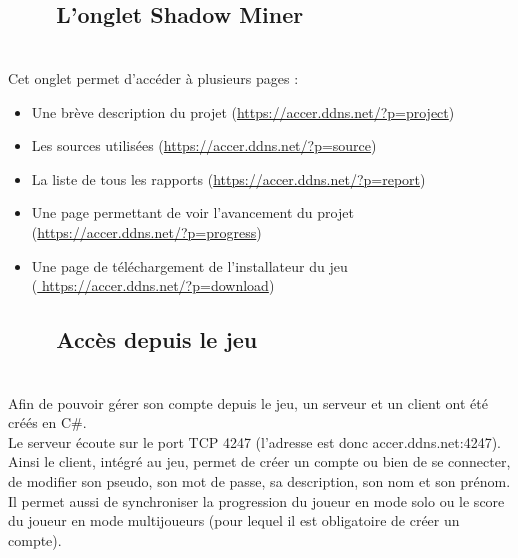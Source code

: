 \documentclass[titlepage, 13px, a4paper]{report}
\begin{document}
\subsection[L’onglet Shadow Miner]{~~~~L’onglet Shadow Miner}
\paragraph*{} \hspace{0pt} \\
Cet onglet permet d’accéder à plusieurs pages : \\
{\begin{itemize}
	\item Une brève description du projet (\url{https://accer.ddns.net/?p=project})
	\item Les sources utilisées (\url{https://accer.ddns.net/?p=source})
	\item La liste de tous les rapports (\url{https://accer.ddns.net/?p=report})
	\item Une page permettant de voir l’avancement du projet \\
		(\url{https://accer.ddns.net/?p=progress})
	\item Une page de téléchargement de l’installateur du jeu \\
		(\url{ https://accer.ddns.net/?p=download}) \\
\end{itemize}}

\subsection[Accès depuis le jeu]{~~~~Accès depuis le jeu}
\paragraph*{} \hspace{0pt} \\
Afin de pouvoir gérer son compte depuis le jeu, un serveur et un client ont été créés en C\#. \\
Le serveur écoute sur le port TCP 4247 (l’adresse est donc accer.ddns.net:4247). Ainsi le client, 
intégré au jeu, permet de créer un compte ou bien de se connecter, de modifier son pseudo, 
son mot de passe, sa description, son nom et son prénom. \\
Il permet aussi de synchroniser la progression du joueur en mode solo ou le score du joueur 
en mode multijoueurs (pour lequel il est obligatoire de créer un compte). \\
\end{document}
